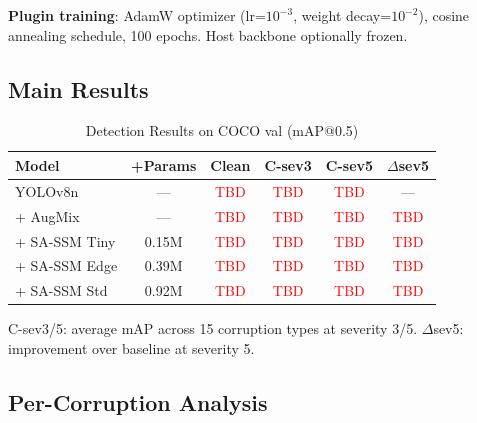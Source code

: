 \documentclass[conference]{IEEEtran}
\newcommand{\tbd}[1]{\textcolor{red}{#1}}
\begin{document}
\textbf{Plugin training}: AdamW optimizer (lr=$10^{-3}$, weight decay=$10^{-2}$), cosine annealing schedule, 100 epochs. Host backbone optionally frozen.

\subsection{Main Results}

\begin{table}[t]
\centering
\caption{Detection Results on COCO val (mAP@0.5)}
\label{tab:main_results}
\small
\begin{tabular}{@{}lccccc@{}}
\toprule
Model & +Params & Clean & C-sev3 & C-sev5 & $\Delta$sev5 \\
\midrule
YOLOv8n & --- & \tbd{TBD} & \tbd{TBD} & \tbd{TBD} & --- \\
\quad + AugMix & --- & \tbd{TBD} & \tbd{TBD} & \tbd{TBD} & \tbd{TBD} \\
\quad + SA-SSM Tiny & 0.15M & \tbd{TBD} & \tbd{TBD} & \tbd{TBD} & \tbd{TBD} \\
\quad + SA-SSM Edge & 0.39M & \tbd{TBD} & \tbd{TBD} & \tbd{TBD} & \tbd{TBD} \\
\quad + SA-SSM Std & 0.92M & \tbd{TBD} & \tbd{TBD} & \tbd{TBD} & \tbd{TBD} \\
\bottomrule
\end{tabular}
\vspace{0.5em}

{\footnotesize C-sev3/5: average mAP across 15 corruption types at severity 3/5. $\Delta$sev5: improvement over baseline at severity 5.}
\end{table}

\subsection{Per-Corruption Analysis}
\end{document}
